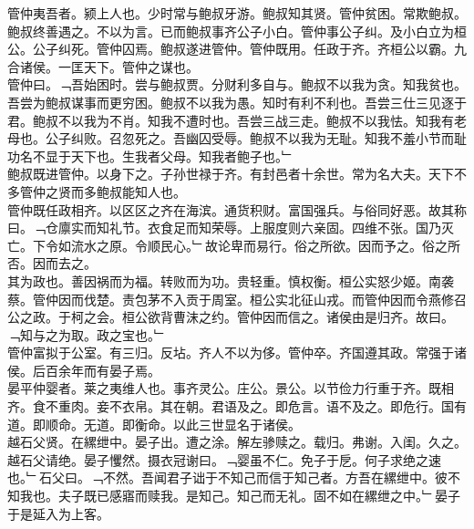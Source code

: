 \documentclass{zhvt-classic}
\begin{document}

\hspace*{2em}管仲夷吾者。颍上人也。少时常与鲍叔牙游。鲍叔知其贤。管仲贫困。常欺鲍叔。鲍叔终善遇之。不以为言。已而鲍叔事齐公子小白。管仲事公子纠。及小白立为桓公。公子纠死。管仲囚焉。鲍叔遂进管仲。管仲既用。任政于齐。齐桓公以霸。九合诸侯。一匡天下。管仲之谋也。\\
\hspace*{2em}管仲曰。﹁吾始困时。尝与鲍叔贾。分财利多自与。鲍叔不以我为贪。知我贫也。吾尝为鲍叔谋事而更穷困。鲍叔不以我为愚。知时有利不利也。吾尝三仕三见逐于君。鲍叔不以我为不肖。知我不遭时也。吾尝三战三走。鲍叔不以我怯。知我有老母也。公子纠败。召忽死之。吾幽囚受辱。鲍叔不以我为无耻。知我不羞小节而耻功名不显于天下也。生我者父母。知我者鲍子也。﹂\\
\hspace*{2em}鲍叔既进管仲。以身下之。子孙世禄于齐。有封邑者十余世。常为名大夫。天下不多管仲之贤而多鲍叔能知人也。\\
\hspace*{2em}管仲既任政相齐。以区区之齐在海滨。通货积财。富国强兵。与俗同好恶。故其称曰。﹁仓廪实而知礼节。衣食足而知荣辱。上服度则六亲固。四维不张。国乃灭亡。下令如流水之原。令顺民心。﹂故论卑而易行。俗之所欲。因而予之。俗之所否。因而去之。\\
\hspace*{2em}其为政也。善因祸而为福。转败而为功。贵轻重。慎权衡。桓公实怒少姬。南袭蔡。管仲因而伐楚。责包茅不入贡于周室。桓公实北征山戎。而管仲因而令燕修召公之政。于柯之会。桓公欲背曹沫之约。管仲因而信之。诸侯由是归齐。故曰。﹁知与之为取。政之宝也。﹂\\
\hspace*{2em}管仲富拟于公室。有三归。反坫。齐人不以为侈。管仲卒。齐国遵其政。常强于诸侯。后百余年而有晏子焉。\\
\hspace*{2em}晏平仲婴者。莱之夷维人也。事齐灵公。庄公。景公。以节俭力行重于齐。既相齐。食不重肉。妾不衣帛。其在朝。君语及之。即危言。语不及之。即危行。国有道。即顺命。无道。即衡命。以此三世显名于诸侯。\\
\hspace*{2em}越石父贤。在縲绁中。晏子出。遭之涂。解左骖赎之。载归。弗谢。入闺。久之。越石父请绝。晏子戄然。摄衣冠谢曰。﹁婴虽不仁。免子于戹。何子求绝之速也。﹂石父曰。﹁不然。吾闻君子诎于不知己而信于知己者。方吾在縲绁中。彼不知我也。夫子既已感寤而赎我。是知己。知己而无礼。固不如在縲绁之中。﹂晏子于是延入为上客。\\
\end{document}
